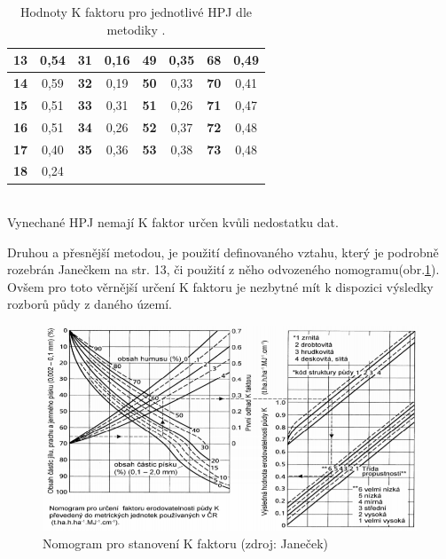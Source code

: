 \begin{table}[hbt]
\begin{center}
\begin{tabular}{|*{8}{c|}}
   \hline                                                        
\bf      13&0,54  &\bf 31&0,16 &\bf  49&0,35 &\bf 68&0,49 \\
   \hline                                                 
\bf      14&0,59  &\bf 32&0,19 &\bf  50&0,33 &\bf 70&0,41 \\
   \hline                                                   
\bf      15&0,51  &\bf 33&0,31 &\bf  51&0,26 &\bf 71&0,47 \\
   \hline                                                 
\bf      16&0,51  &\bf 34&0,26 &\bf  52&0,37 &\bf 72&0,48 \\
   \hline                                                 
\bf      17&0,40  &\bf 35&0,36 &\bf  53&0,38 &\bf 73&0,48 \\
   \hline                            
\bf      18&0,24  &      &     &       &     &  &   \\
   \hline                                  
    \end{tabular}\\
    \vspace{10px}
Vynechané HPJ nemají K faktor určen kvůli nedostatku dat.
  \caption[Hodnoty K faktoru pro jednotlivé HPJ]{Hodnoty K faktoru pro jednotlivé HPJ dle metodiky \cite{janecek2012}.}
  \label{hpj_k}
\end{center}
\end{table}
\FloatBarrier
Druhou a přesnější metodou, je použití definovaného vztahu, který je podrobně rozebrán Janečkem\cite{janecek2012} na str. 13, či použití z něho odvozeného nomogramu(obr.\ref{fig:k_faktor}). Ovšem pro toto věrnější určení K faktoru je nezbytné mít k dispozici výsledky rozborů půdy z daného území.\cite{janecek2012}

\begin{figure}[H]
    \centering
      \includegraphics[scale=0.85]{./pictures/k_faktor_nomogram.png}
      \caption[Nomogram pro stanovení K faktoru]{Nomogram pro stanovení K faktoru (zdroj: Janeček\cite{janecek2012})}
      \label{fig:k_faktor}
\end{figure}
